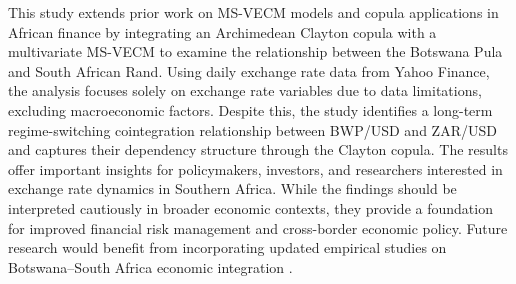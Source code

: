 \documentclass[a4paper]{article}
\theoremstyle{plain}
\theoremstyle{definition}
\theoremstyle{remark}
\begin{document}
This study extends prior work on MS-VECM models \citep{phoong2013markov, chkili2014exchange} and copula applications in African finance \citep{molefe2020roads, masuku2016relationship} by integrating an Archimedean Clayton copula with a multivariate MS-VECM to examine the relationship between the Botswana Pula and South African Rand. Using daily exchange rate data from Yahoo Finance, the analysis focuses solely on exchange rate variables due to data limitations, excluding macroeconomic factors. Despite this, the study identifies a long-term regime-switching cointegration relationship between BWP/USD and ZAR/USD and captures their dependency structure through the Clayton copula. The results offer important insights for policymakers, investors, and researchers interested in exchange rate dynamics in Southern Africa. While the findings should be interpreted cautiously in broader economic contexts, they provide a foundation for improved financial risk management and cross-border economic policy. Future research would benefit from incorporating updated empirical studies on Botswana–South Africa economic integration \citep{Botlhale2021, israel2023relationship, Thupeng2021}.
 \newpage



\end{document}
